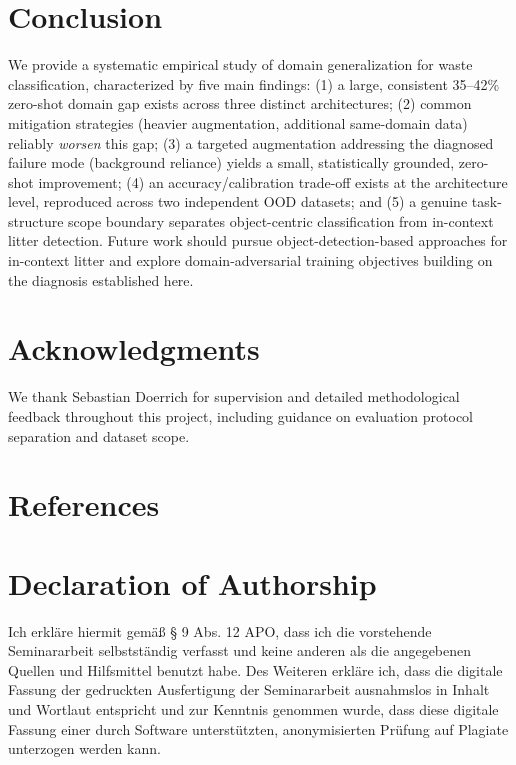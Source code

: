 \documentclass[a4paper]{article}
\begin{document}
\section{Conclusion}
\label{sec:conclusion}

We provide a systematic empirical study of domain generalization for waste classification, characterized by five main findings: (1) a large, consistent 35--42\% zero-shot domain gap exists across three distinct architectures; (2) common mitigation strategies (heavier augmentation, additional same-domain data) reliably \emph{worsen} this gap; (3) a targeted augmentation addressing the diagnosed failure mode (background reliance) yields a small, statistically grounded, zero-shot improvement; (4) an accuracy/calibration trade-off exists at the architecture level, reproduced across two independent OOD datasets; and (5) a genuine task-structure scope boundary separates object-centric classification from in-context litter detection. Future work should pursue object-detection-based approaches for in-context litter and explore domain-adversarial training objectives building on the diagnosis established here.

\section*{Acknowledgments}
We thank Sebastian Doerrich for supervision and detailed methodological feedback throughout this project, including guidance on evaluation protocol separation and dataset scope.

\newpage
\section*{References}
\small



\newpage
\section*{Declaration of Authorship}
Ich erkl\"{a}re hiermit gem\"{a}\ss{} \S{} 9 Abs. 12 APO, dass ich die vorstehende Seminararbeit selbstst\"{a}ndig verfasst und keine anderen als die angegebenen Quellen und Hilfsmittel benutzt habe. Des Weiteren erkl\"{a}re ich, dass die digitale Fassung der gedruckten Ausfertigung der Seminararbeit ausnahmslos in Inhalt und Wortlaut entspricht und zur Kenntnis genommen wurde, dass diese digitale Fassung einer durch Software unterst\"{u}tzten, anonymisierten Pr\"{u}fung auf Plagiate unterzogen werden kann.
\end{document}

